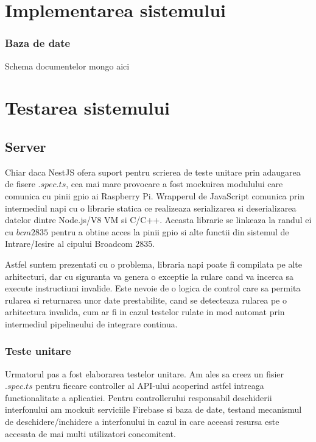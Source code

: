 \section {Implementarea sistemului}

\subsubsection {Baza de date}

Schema documentelor mongo aici

\section {Testarea sistemului}

\subsection {Server}

Chiar daca NestJS ofera suport pentru scrierea de teste unitare prin adaugarea de fisere $.spec.ts$, cea mai mare provocare a fost mockuirea modulului care comunica cu pinii \acrshort{gpio} ai Raspberry Pi. Wrapperul de JavaScript comunica prin intermediul \acrfull{napi} cu o librarie statica ce realizeaza serializarea si deserializarea datelor dintre Node.js/V8 VM si C/C++. Aceasta librarie se linkeaza la randul ei cu $bcm2835$ pentru a obtine acces la pinii \acrshort{gpio} si alte functii din sistemul de Intrare/Iesire al cipului Broadcom 2835.

Astfel suntem prezentati cu o problema, libraria \acrshort{napi} poate fi compilata pe alte arhitecturi, dar cu siguranta va genera o exceptie la rulare cand va incerca sa execute instructiuni invalide. Este nevoie de o logica de control care sa permita rularea si returnarea unor date prestabilite, cand se detecteaza rularea pe o arhitectura invalida, cum ar fi in cazul testelor rulate in mod automat prin intermediul pipelineului de integrare continua.

\subsubsection {Teste unitare}

Urmatorul pas a fost elaborarea testelor unitare. Am ales sa creez un fisier $.spec.ts$ pentru fiecare controller al API-ului acoperind astfel intreaga functionalitate a aplicatiei. Pentru controllerului responsabil deschiderii interfonului am mockuit serviciile Firebase si baza de date, testand mecanismul de deschidere/inchidere a interfonului in cazul in care aceeasi resursa este accesata de mai multi utilizatori concomitent.

